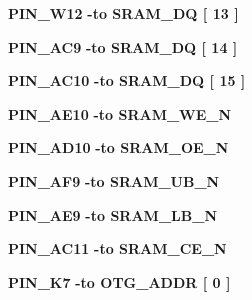 \begin{DoxyCompactItemize}
\item 
{\bf P\+I\+N\+\_\+\+W12} {\bfseries \textcolor{vhdlchar}{-\/}\textcolor{keywordflow}{to}\textcolor{vhdlchar}{ }\textcolor{vhdlchar}{S\+R\+A\+M\+\_\+\+DQ}\textcolor{vhdlchar}{ }\textcolor{vhdlchar}{[}\textcolor{vhdlchar}{ } \textcolor{vhdldigit}{13} \textcolor{vhdlchar}{ }\textcolor{vhdlchar}{]}\textcolor{vhdlchar}{ }} 
\item 
{\bf P\+I\+N\+\_\+\+A\+C9} {\bfseries \textcolor{vhdlchar}{-\/}\textcolor{keywordflow}{to}\textcolor{vhdlchar}{ }\textcolor{vhdlchar}{S\+R\+A\+M\+\_\+\+DQ}\textcolor{vhdlchar}{ }\textcolor{vhdlchar}{[}\textcolor{vhdlchar}{ } \textcolor{vhdldigit}{14} \textcolor{vhdlchar}{ }\textcolor{vhdlchar}{]}\textcolor{vhdlchar}{ }} 
\item 
{\bf P\+I\+N\+\_\+\+A\+C10} {\bfseries \textcolor{vhdlchar}{-\/}\textcolor{keywordflow}{to}\textcolor{vhdlchar}{ }\textcolor{vhdlchar}{S\+R\+A\+M\+\_\+\+DQ}\textcolor{vhdlchar}{ }\textcolor{vhdlchar}{[}\textcolor{vhdlchar}{ } \textcolor{vhdldigit}{15} \textcolor{vhdlchar}{ }\textcolor{vhdlchar}{]}\textcolor{vhdlchar}{ }} 
\item 
{\bf P\+I\+N\+\_\+\+A\+E10} {\bfseries \textcolor{vhdlchar}{-\/}\textcolor{keywordflow}{to}\textcolor{vhdlchar}{ }\textcolor{vhdlchar}{S\+R\+A\+M\+\_\+\+W\+E\+\_\+N}\textcolor{vhdlchar}{ }} 
\item 
{\bf P\+I\+N\+\_\+\+A\+D10} {\bfseries \textcolor{vhdlchar}{-\/}\textcolor{keywordflow}{to}\textcolor{vhdlchar}{ }\textcolor{vhdlchar}{S\+R\+A\+M\+\_\+\+O\+E\+\_\+N}\textcolor{vhdlchar}{ }} 
\item 
{\bf P\+I\+N\+\_\+\+A\+F9} {\bfseries \textcolor{vhdlchar}{-\/}\textcolor{keywordflow}{to}\textcolor{vhdlchar}{ }\textcolor{vhdlchar}{S\+R\+A\+M\+\_\+\+U\+B\+\_\+N}\textcolor{vhdlchar}{ }} 
\item 
{\bf P\+I\+N\+\_\+\+A\+E9} {\bfseries \textcolor{vhdlchar}{-\/}\textcolor{keywordflow}{to}\textcolor{vhdlchar}{ }\textcolor{vhdlchar}{S\+R\+A\+M\+\_\+\+L\+B\+\_\+N}\textcolor{vhdlchar}{ }} 
\item 
{\bf P\+I\+N\+\_\+\+A\+C11} {\bfseries \textcolor{vhdlchar}{-\/}\textcolor{keywordflow}{to}\textcolor{vhdlchar}{ }\textcolor{vhdlchar}{S\+R\+A\+M\+\_\+\+C\+E\+\_\+N}\textcolor{vhdlchar}{ }} 
\item 
{\bf P\+I\+N\+\_\+\+K7} {\bfseries \textcolor{vhdlchar}{-\/}\textcolor{keywordflow}{to}\textcolor{vhdlchar}{ }\textcolor{vhdlchar}{O\+T\+G\+\_\+\+A\+D\+DR}\textcolor{vhdlchar}{ }\textcolor{vhdlchar}{[}\textcolor{vhdlchar}{ } \textcolor{vhdldigit}{0} \textcolor{vhdlchar}{ }\textcolor{vhdlchar}{]}\textcolor{vhdlchar}{ }} 

\end{DoxyCompactItemize}
